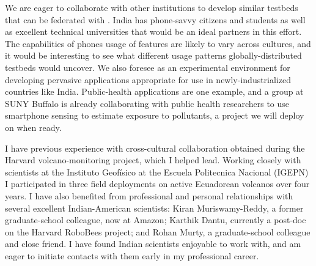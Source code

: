 
We are eager to collaborate with other institutions to develop similar
testbeds that can be federated with \PhoneLab{}. India has phone-savvy
citizens and students as well as excellent technical universities that would
be an ideal partners in this effort. The capabilities of phones usage of
features are likely to vary across cultures, and it would be interesting to
see what different usage patterns globally-distributed testbeds would
uncover. We also foresee \PhoneLab{} as an experimental environment for
developing pervasive applications appropriate for use in newly-industrialized
countries like India. Public-health applications are one example, and a group
at SUNY Buffalo is already collaborating with public health researchers to
use smartphone sensing to estimate exposure to pollutants, a project we will
deploy on \PhoneLab{} when ready.


I have previous experience with cross-cultural collaboration obtained during
the Harvard volcano-monitoring project, which I helped lead. Working closely
with scientists at the Instituto Geof\'{i}sico at the Escuela Politecnica
Nacional (IGEPN) I participated in three field deployments on active
Ecuadorean volcanos over four years. I have also benefited from professional
and personal relationships with several excellent Indian-American scientists:
Kiran Muriswamy-Reddy, a former graduate-school colleague, now at Amazon;
Karthik Dantu, currently a post-doc on the Harvard RoboBees project; and
Rohan Murty, a graduate-school colleague and close friend. I have found
Indian scientists enjoyable to work with, and am eager to initiate contacts
with them early in my professional career.

